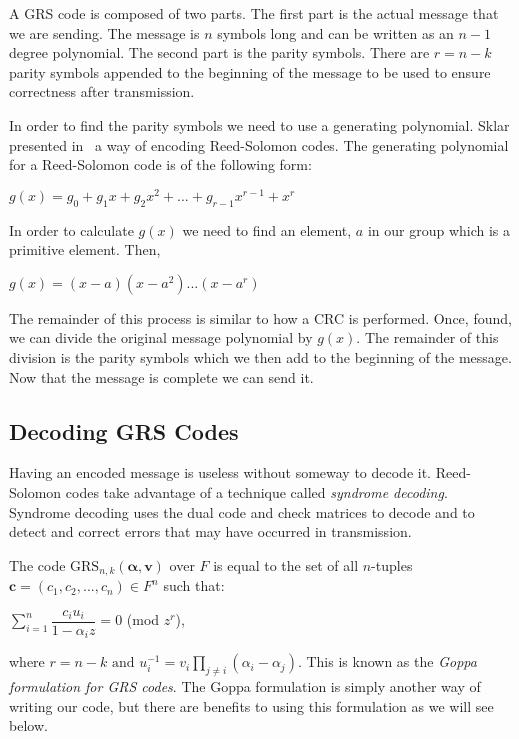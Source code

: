 \documentclass{article}
\begin{document}
A GRS code is composed of two parts. The first part is the actual message that we are sending. The message is $n$ symbols long and can be written as an $n - 1$ degree polynomial. The second part is the parity symbols. There are $r = n - k$ parity symbols appended to the beginning of the message to be used to ensure correctness after transmission. 

In order to find the parity symbols we need to use a generating polynomial. Sklar presented in~\cite{Sklar:2001} a way of encoding Reed-Solomon codes. The generating polynomial for a Reed-Solomon code is of the following form:
\begin{center}
$g(x) = g_{0} + g_{1}x + g_{2}x^{2} + ... + g_{r - 1}x^{r - 1} + x^{r}$
\end{center}
In order to calculate $g(x)$ we need to find an element, $a$ in our group which is a primitive element. Then,
\begin{center}
$g(x) = (x - a)(x - a^{2})...(x - a^{r})$
\end{center}

The remainder of this process is similar to how a CRC is performed. Once, found, we can divide the original message polynomial by $g(x)$. The remainder of this division is the parity symbols which we then add to the beginning of the message. Now that the message is complete we can send it.

\subsection{Decoding GRS Codes}
Having an encoded message is useless without someway to decode it. Reed-Solomon codes take advantage of a technique called \textit{syndrome decoding}. Syndrome decoding uses the dual code and check matrices to decode and to detect and correct errors that may have occurred in transmission. 

The code $\text{GRS}_{n,k}(\boldsymbol\alpha, \textbf{v})$ over $F$ is equal to the set of all $n$-tuples $\textbf{c} = (c_{1},c_{2},...,c_{n}) \in F^{n}$ such that:
\begin{center}
$\sum\limits_{i = 1}^{n} \dfrac{c_{i}u_{i}}{1 - \alpha_{i}z} = 0$ (mod $z^{r}$),
\end{center}
where $r = n - k \text{ and } u_{i}^{-1} = v_{i}\prod\limits_{j \neq i} (\alpha_{i} - \alpha_{j})$. This is known as the \textit{Goppa formulation for GRS codes}. The Goppa formulation is simply another way of writing our code, but there are benefits to using this formulation as we will see below.
\end{document}
